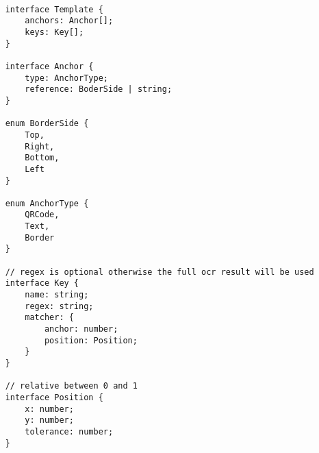 \documentclass[../ockr-specification.tex]{subfiles}
\begin{document}
\begin{lstlisting}
    
    interface Template {
        anchors: Anchor[];
        keys: Key[];
    }

    interface Anchor {
        type: AnchorType;
        reference: BoderSide | string;
    }

    enum BorderSide {
        Top,
        Right,
        Bottom,
        Left
    }

    enum AnchorType {
        QRCode,
        Text,
        Border
    }

    // regex is optional otherwise the full ocr result will be used
    interface Key {
        name: string;
        regex: string;
        matcher: {
            anchor: number;
            position: Position;
        } 
    }

    // relative between 0 and 1
    interface Position {
        x: number;
        y: number;
        tolerance: number;
    }
    
\end{lstlisting}
\end{document}
